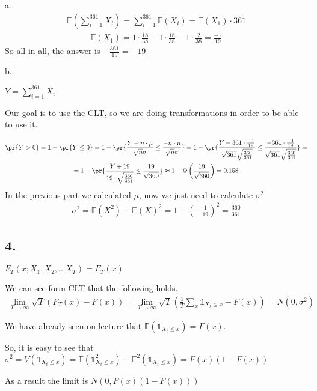a. 
\begin{gather*}
    \mathds{E}(\sum_{i=1}^{361} X_i)= \sum_{i=1}^{361} \mathds{E}(X_i) =\mathds{E}(X_1)\cdot361
\end{gather*}
\begin{gather*}
    \mathds{E}(X_1)=1\cdot\frac{18}{38}-1\cdot\frac{18}{38}-1\cdot\frac{2}{38}=\frac{-1}{19}
\end{gather*}
So all in all, the answer is $-\frac{361}{19}=-19$

b. 

$Y=\sum_{i=1}^{361} X_i$

Our goal is to use the CLT, so we are doing transformations in order to be able to use it.

\begin{gather*}
    \pr{Y>0} = 1- \pr{Y\le 0} = 1- \pr{\frac{Y-n\cdot \mu}{\sqrt{n}\sigma} \le \frac{-n\cdot \mu}{\sqrt{n}\sigma} } = 1- \pr{\frac{Y-361\cdot \frac{-1}{19}}{\sqrt{361}\sqrt{\frac{360}{361}}} \le \frac{-361\cdot \frac{-1}{19}}{\sqrt{361}\sqrt{\frac{360}{361}}} } = \\
    = 1 - \pr{\frac{Y+19}{19\cdot\sqrt{\frac{360}{361}}}\le \frac{19}{\sqrt{360}}} \approx 1- \Phi\left(\frac{19}{\sqrt{360}}\right) = 0.158
\end{gather*}
In the previous part we calculated $\mu$, now we just need to calculate $\sigma^2$
\begin{gather*}
    \sigma^2=\mathds{E}(X^2)- \mathds{E}(X)^2 = 1- \left(-\frac{1}{19}\right)^2= \frac{360}{361}
\end{gather*}

\subsection*{4.}
$F_T(x; X_1, X_2, ... X_T)=F_T(x)$

We can see form CLT that the following holds.
\begin{gather*}
    \lim_{T\to \infty} \sqrt{T}(F_T(x)-F(x))= \lim_{T\to \infty} \sqrt{T}\left(\frac{1}{T}\sum_x \mathds{1}_{X_t\le x} - F(x)\right) = N(0,\sigma^2)
\end{gather*}

We have already seen on lecture that $\mathds{E}(\mathds{1}_{X_t\le x})=F(x)$. 

So, it is easy to see that $\sigma^2= V(\mathds{1}_{X_t\le x})= \mathds{E}(\mathds{1}_{X_t\le x}^2)- \mathds{E}^2(\mathds{1}_{X_t\le x})=F(x)(1-F(x))$

As a result the limit is $N(0, F(x)(1-F(x)))$

